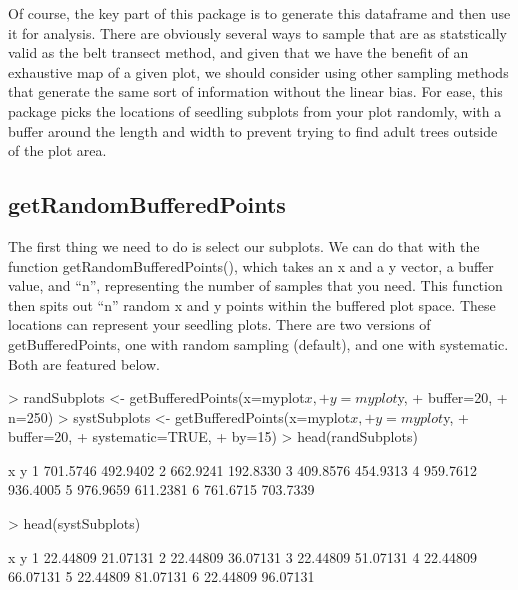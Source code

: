 \documentclass{article}
\begin{document}
Of course, the key part of this package is to generate this dataframe and then use it for analysis. There are obviously several ways to sample that are as statstically valid as the belt transect method, and given that we have the benefit of an exhaustive map of a given plot, we should consider using other sampling methods that generate the same sort of information without the linear bias. For ease, this package picks the locations of seedling subplots from your plot randomly, with a buffer around the length and width to prevent trying to find adult trees outside of the plot area.

\subsection{getRandomBufferedPoints}

The first thing we need to do is select our subplots. We can do that with the function getRandomBufferedPoints(), which takes an x and a y vector, a buffer value, and ``n'', representing the number of samples that you need. This function then spits out ``n'' random x and y points within the buffered plot space. These locations can represent your seedling plots. There are two versions of getBufferedPoints, one with random sampling (default), and one with systematic. Both are featured below.

\begin{Schunk}
\begin{Sinput}
> randSubplots <- getBufferedPoints(x=myplot$x,
+                                   y=myplot$y,
+                                   buffer=20,
+                                   n=250)
> systSubplots <- getBufferedPoints(x=myplot$x,
+                                     y=myplot$y,
+                                     buffer=20,
+                                     systematic=TRUE,
+                                     by=15)
> head(randSubplots)
\end{Sinput}
\begin{Soutput}
         x        y
1 701.5746 492.9402
2 662.9241 192.8330
3 409.8576 454.9313
4 959.7612 936.4005
5 976.9659 611.2381
6 761.6715 703.7339
\end{Soutput}
\begin{Sinput}
> head(systSubplots)
\end{Sinput}
\begin{Soutput}
         x        y
1 22.44809 21.07131
2 22.44809 36.07131
3 22.44809 51.07131
4 22.44809 66.07131
5 22.44809 81.07131
6 22.44809 96.07131
\end{Soutput}
\end{Schunk}
\end{document}
